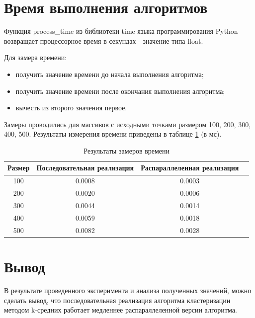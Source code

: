 \section{Время выполнения алгоритмов}

Функция process\_time из библиотеки time языка программирования Python возвращает  процессорное время в секундах - значение типа float.

Для замера времени:
\begin{itemize}
	\item получить значение времени до начала выполнения алгоритма;
	\item  получить значение времени после окончания выполнения алгоритма;
	\item вычесть из второго значения первое.
\end{itemize}

Замеры проводились для массивов с исходными точками размером 100, 200, 300, 400, 500. Результаты измерения времени приведены в таблице \ref{tbl:time_even} (в мс).

\begin{table}[h]
    \begin{center}
        \begin{threeparttable}
        \captionsetup{justification=raggedright,singlelinecheck=off}
        \caption{Результаты замеров времени}
        \label{tbl:time_even}
        \begin{tabular}{|c|c|c|c|}
            \hline
            Размер & Последовательная реализация & Распараллеленная реализация \\
            \hline
		    100 & 0.0008 & 0.0003 \\ 
		    \hline
		    200 & 0.0020 & 0.0006 \\ 
		    \hline
		    300 & 0.0044 & 0.0014 \\ 
		    \hline
		    400 & 0.0059 & 0.0018 \\ 
		    \hline
		    500 & 0.0082 & 0.0028 \\ 
		    \hline
		\end{tabular}
    \end{threeparttable}
\end{center}
\end{table}



\section{Вывод}

В результате проведенного эксперимента и анализа полученных значений, можно сделать вывод,
что последовательная реализация алгоритма кластеризации методом k-средних работает медленнее распараллеленной версии
алгоритма.